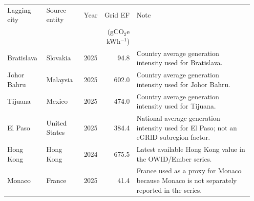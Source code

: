 \begin{tabular}{@{}llrrp{5.8cm}@{}}
\toprule
Lagging city & Source entity & Year & Grid EF & Note \\
 & & & (gCO$_2$e kWh$^{-1}$) & \\
\midrule
Bratislava & Slovakia & 2025 & 94.8 & Country average generation intensity used for Bratislava. \\
Johor Bahru & Malaysia & 2025 & 602.0 & Country average generation intensity used for Johor Bahru. \\
Tijuana & Mexico & 2025 & 474.0 & Country average generation intensity used for Tijuana. \\
El Paso & United States & 2025 & 384.4 & National average generation intensity used for El Paso; not an eGRID subregion factor. \\
Hong Kong & Hong Kong & 2024 & 675.5 & Latest available Hong Kong value in the OWID/Ember series. \\
Monaco & France & 2025 & 41.4 & France used as a proxy for Monaco because Monaco is not separately reported in the series. \\
\bottomrule
\end{tabular}
